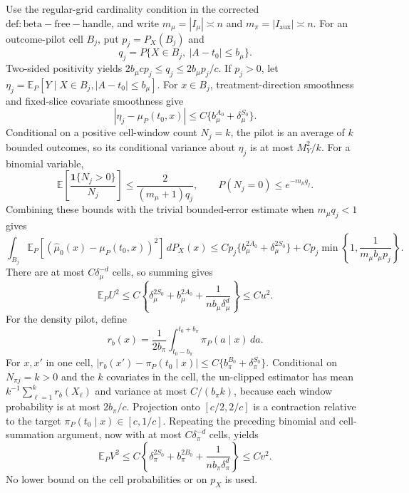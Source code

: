Use the regular-grid cardinality condition in the corrected \(\mathrm{def:beta-free-handle}\), and write \(m_\mu=|I_\mu|\asymp n\) and \(m_\pi=|I_{\mathrm{aux}}|\asymp n\).  For an outcome-pilot cell \(B_j\), put \(p_j=P_X(B_j)\) and
\[
q_j=P\{X\in B_j,\ |A-t_0|\le b_\mu\}.
\]
Two-sided positivity yields \(2b_\mu c p_j\le q_j\le2b_\mu p_j/c\).  If \(p_j>0\), let \(\eta_j=\mathbb E_P[Y\mid X\in B_j,|A-t_0|\le b_\mu]\).  For \(x\in B_j\), treatment-direction smoothness and fixed-slice covariate smoothness give
\[
|\eta_j-\mu_P(t_0,x)|\le C\{b_\mu^{A_0}+\delta_\mu^{S_0}\}.
\]
Conditional on a positive cell-window count \(N_j=k\), the pilot is an average of \(k\) bounded outcomes, so its conditional variance about \(\eta_j\) is at most \(M_Y^2/k\).  For a binomial variable,
\[
\mathbb E\!\left[\frac{\mathbf1\{N_j>0\}}{N_j}\right]
\le\frac{2}{(m_\mu+1)q_j},
\qquad
P(N_j=0)\le e^{-m_\mu q_j}.
\]
Combining these bounds with the trivial bounded-error estimate when \(m_\mu q_j<1\) gives
\[
\int_{B_j}\mathbb E_P[(\widehat\mu_0(x)-\mu_P(t_0,x))^2]\,dP_X(x)
\le Cp_j\{b_\mu^{2A_0}+\delta_\mu^{2S_0}\}
+Cp_j\min\!\left\{1,\frac1{m_\mu b_\mu p_j}\right\}.
\]
There are at most \(C\delta_\mu^{-d}\) cells, so summing gives
\[
\mathbb E_PU^2\le C\left\{\delta_\mu^{2S_0}+b_\mu^{2A_0}+\frac1{nb_\mu\delta_\mu^d}\right\}\le Cu^2.
\]
For the density pilot, define
\[
r_b(x)=\frac1{2b_\pi}\int_{t_0-b_\pi}^{t_0+b_\pi}\pi_P(a\mid x)\,da.
\]
For \(x,x'\) in one cell, \(|r_b(x')-\pi_P(t_0\mid x)|\le C\{b_\pi^{B_0}+\delta_\pi^{S_0}\}\).  Conditional on \(N_{\pi j}=k>0\) and the \(k\) covariates in the cell, the un-clipped estimator has mean \(k^{-1}\sum_{\ell=1}^kr_b(X_\ell)\) and variance at most \(C/(b_\pi k)\), because each window probability is at most \(2b_\pi/c\).  Projection onto \([c/2,2/c]\) is a contraction relative to the target \(\pi_P(t_0\mid x)\in[c,1/c]\).  Repeating the preceding binomial and cell-summation argument, now with at most \(C\delta_\pi^{-d}\) cells, yields
\[
\mathbb E_PV^2\le C\left\{\delta_\pi^{2S_0}+b_\pi^{2B_0}+\frac1{nb_\pi\delta_\pi^d}\right\}\le Cv^2.
\]
No lower bound on the cell probabilities or on \(p_X\) is used.